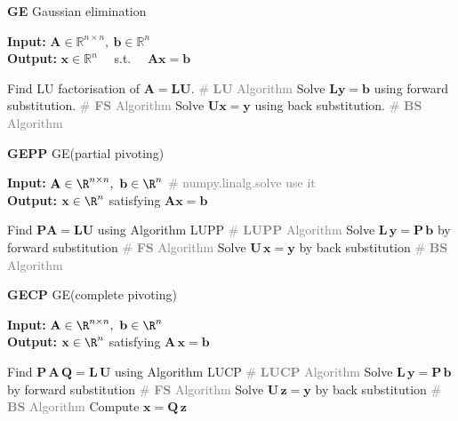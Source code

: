 \documentclass{note}
\newcommand{\codealg}[1]{\textcolor{gray}{\quad \# \textbf{#1} Algorithm}}
\begin{document}
\vspace{-26pt}

\begin{multicols}{3}

\begin{algorithm}[H]
\tiny
\caption*{\textbf{GE} Gaussian elimination \vspace{-0.1cm} \ \ }
\textbf{Input:} $\mathbf{A} \in \mathbb{R}^{n \times n},\ \mathbf{b} \in \mathbb{R}^n$ \\
\textbf{Output:} $\mathbf{x} \in \mathbb{R}^n$ \ \ s.t. \ \ $\mathbf{Ax} = \mathbf{b}$
\begin{algorithmic}[1]
  \State Find LU factorisation of $\mathbf{A}=\mathbf{LU}$. \codealg{LU}
  \State Solve $\mathbf{Ly} = \mathbf{b}$ using forward substitution. \codealg{FS}
  \State Solve $\mathbf{Ux} = \mathbf{y}$ using back substitution. \codealg{BS}
\end{algorithmic}
\end{algorithm}

\begin{algorithm}[H]
\tiny
\caption*{\textbf{GEPP} \scriptsize GE(partial pivoting) \vspace{-0.1cm} \ \ }
\textbf{Input:} $\mathbf{A}\in\R^{n\times n},\ \mathbf b\in\R^n$ \textcolor{gray}{\quad \# numpy.linalg.solve use it} \\
\textbf{Output:} $\mathbf x\in\R^n$ satisfying $\mathbf{A x}=\mathbf b$
\begin{algorithmic}[1]
  \State Find $\mathbf P\mathbf A=\mathbf L\mathbf U$ using Algorithm LUPP \codealg{LUPP}
  \State Solve $\mathbf L\,\mathbf y = \mathbf P\,\mathbf b$ by forward substitution \codealg{FS}
  \State Solve $\mathbf U\,\mathbf x = \mathbf y$ by back substitution \codealg{BS}
\end{algorithmic}
\end{algorithm}

\begin{algorithm}[H]
\tiny
\caption*{\textbf{GECP} \scriptsize GE(complete pivoting) \vspace{-0.1cm} \ \ }
\textbf{Input:} $\mathbf{A}\in\R^{n\times n},\ \mathbf b\in\R^n$ \\
\textbf{Output:} $\mathbf x\in\R^n$ satisfying $\mathbf A\,\mathbf x=\mathbf b$
\begin{algorithmic}[1]
  \State Find $\mathbf P\,\mathbf A\,\mathbf Q = \mathbf L\,\mathbf U$ using Algorithm LUCP \codealg{LUCP}
  \State Solve $\mathbf L\,\mathbf y = \mathbf P\,\mathbf b$ by forward substitution \codealg{FS}
  \State Solve $\mathbf U\,\mathbf z = \mathbf y$ by back substitution \codealg{BS}
  \State Compute $\mathbf x = \mathbf Q\,\mathbf z$
\end{algorithmic}
\end{algorithm}

\end{multicols}
\end{document}
